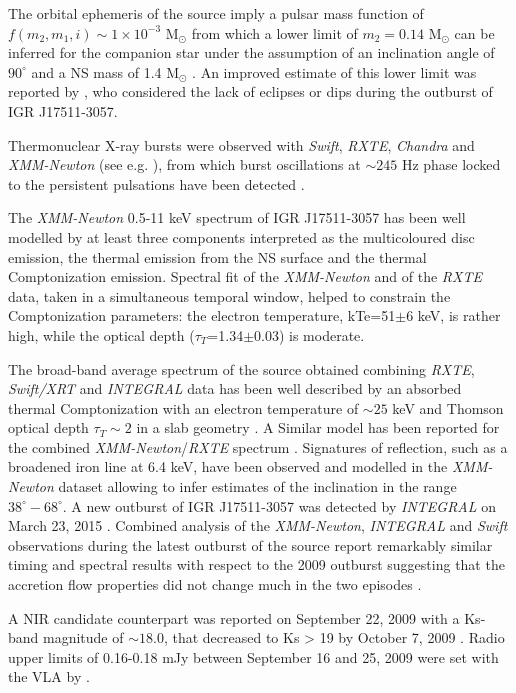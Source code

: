 \documentclass[graybox]{svmult}
\def \inte {{\em INTEGRAL\xspace}}
\def \swift {{\em Swift\xspace}}
\def \chandra {{\em Chandra\xspace}}
\def \xmm {{\em XMM-Newton\xspace}}
\def \rxte {{\em RXTE\xspace}}
\def \swiftxrt{{\em Swift/XRT\xspace}}
\begin{document}
The orbital ephemeris of the source imply a pulsar mass function of $f(m_2,m_1,i) \sim 1\times10^{-3}$ M$_\odot$ from which a lower limit of $m_2=0.14$ M$_\odot$ can be inferred for the companion star under the assumption of an inclination angle of $90^\circ$ and a NS mass of 1.4 M$_\odot$ \cite{Markwardt2009}. An improved estimate of this lower limit was reported by \cite{Papitto2010}, who considered the lack of eclipses or dips during the outburst of IGR J17511-3057.

Thermonuclear X-ray bursts were observed with \swift{}, \rxte{}, \chandra{} and \xmm{} (see e.g. \cite{Bozzo2010,Watts2009b,Novak2009, Papitto2010}), from which burst oscillations at $\sim245$ Hz phase locked to the persistent pulsations have been detected \cite{Watts2009b,Papitto2010,Altamirano2010c,Riggio2011}. 

The \xmm{} 0.5-11 keV spectrum of IGR J17511-3057 has been well modelled by at least three components interpreted as the multicoloured disc emission, the thermal emission from the NS surface and the thermal Comptonization emission. Spectral fit of the \xmm{} and of the \rxte{}
data, taken in a simultaneous temporal window, helped to constrain the Comptonization parameters: the electron temperature, kTe=51$\pm$6 keV, is rather high, while the optical
depth ($\tau_T$=1.34$\pm$0.03) is moderate.

The broad-band average spectrum of the source obtained combining \rxte{}, \swiftxrt{} and \inte{} data has been well described by an absorbed thermal Comptonization with an electron temperature of $\sim25$ keV and Thomson optical depth $\tau_T\sim2$ in a slab geometry \cite{Falanga2011}. A Similar model has been reported for the combined \xmm{}/\rxte{} spectrum \cite{Papitto2010}. Signatures of reflection, such as a broadened iron line at 6.4 keV, have been observed and modelled in the \xmm{} dataset \cite{Papitto2010} allowing to infer estimates of the inclination in the range $38^\circ-68^\circ$. A new outburst of IGR J17511-3057 was detected by \inte{} on March 23, 2015 \cite{Bozzo2015b,Bozzo2015c}. Combined analysis of the \xmm{}, \inte{} and \swift{} observations during the latest outburst of the source report remarkably similar timing and spectral results with respect to the 2009 outburst suggesting that the accretion flow properties did not change much in the two episodes \cite{Papitto2016}.

A NIR candidate counterpart was reported on September 22, 2009 with a Ks-band magnitude of $\sim18.0$, that decreased to Ks > 19 by October 7, 2009 \cite{Torres2009}. Radio upper limits of 0.16-0.18 mJy between September 16 and 25, 2009 were set
with the VLA by \cite{MillerJones2009}.
\end{document}
